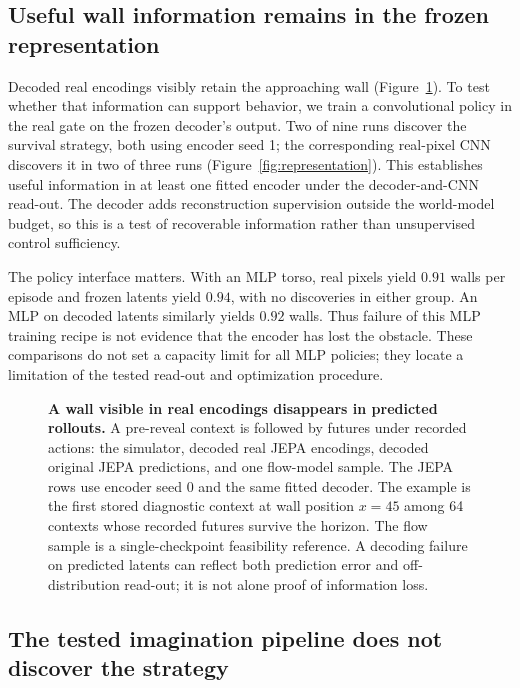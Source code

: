 \subsection{Useful wall information remains in the frozen representation}
\label{sec:results-wall}

Decoded real encodings visibly retain the approaching wall (Figure~\ref{fig:rollouts}). To test
whether that information can support behavior, we train a convolutional policy in the real gate
on the frozen decoder's output. Two of nine runs discover the survival strategy, both using encoder
seed 1; the corresponding real-pixel CNN discovers it in two of three runs
(Figure~\ref{fig:representation}). This establishes useful information in at least one fitted encoder
under the decoder-and-CNN read-out. The decoder adds reconstruction supervision outside the
world-model budget, so this is a test of recoverable information rather than unsupervised control
sufficiency.

The policy interface matters. With an MLP torso, real pixels yield $0.91$ walls per episode and
frozen latents yield $0.94$, with no discoveries in either group. An MLP on decoded latents similarly
yields $0.92$ walls. Thus failure of this MLP training recipe is not evidence that the encoder has
lost the obstacle. These comparisons do not set a capacity limit for all MLP policies; they locate
a limitation of the tested read-out and optimization procedure.

\begin{figure}[t]
\centering
{}
\caption{\textbf{A wall visible in real encodings disappears in predicted rollouts.} A pre-reveal
context is followed by futures under recorded actions: the simulator, decoded real JEPA encodings,
decoded original JEPA predictions, and one flow-model sample. The JEPA rows use encoder seed 0
and the same fitted decoder. The example is the first stored diagnostic context at wall position
$x=45$ among 64 contexts whose recorded futures survive the horizon. The flow sample is a single-checkpoint feasibility reference.
A decoding failure on predicted latents can reflect both prediction error and off-distribution
read-out; it is not alone proof of information loss.}
\label{fig:rollouts}
\end{figure}

\subsection{The tested imagination pipeline does not discover the strategy}
\label{sec:results-ppo}
\label{sec:results}

